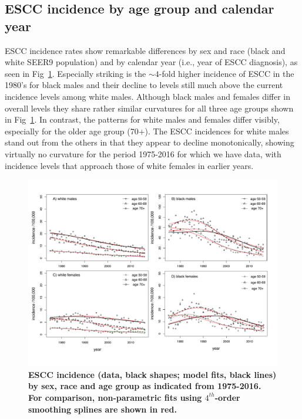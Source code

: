 \documentclass[10pt,letterpaper]{article}
\begin{document}
\subsection*{ESCC incidence by age group and calendar year}
ESCC incidence rates show remarkable differences by sex and race (black and white SEER9 population) and by calendar year (i.e., year of ESCC diagnosis), as seen in Fig~\ref{fig4}. Especially striking is the $\sim 4$-fold higher incidence of ESCC in the 1980's for black males and their decline to levels still much above the current incidence levels among white males. Although black males and females differ in overall levels they share rather similar curvatures for all three age groups shown in Fig~\ref{fig4}. In contrast, the patterns for white males and females differ visibly, especially for the older age group (70+). The ESCC incidences for white males stand out from the others in that they appear to decline monotonically, showing virtually no curvature for the period 1975-2016 for which we have data, with incidence levels that approach those of white females in earlier years.
\medskip
\begin{figure}[t]
\begin{adjustwidth}{-2.in}{0in} %
\includegraphics[scale=0.7, trim=0 20 0 50]{AgeSpec_Incidence_by_CY_SEER9-2016_panel.pdf}
\caption{{\bf ESCC incidence (data, black shapes; model fits, black lines) by sex, race and age group as indicated from 1975-2016. For comparison, non-parametric fits using $4^{th}$-order smoothing splines are shown in red.}}
\label{fig4}
\end{adjustwidth}
\end{figure}
\end{document}

